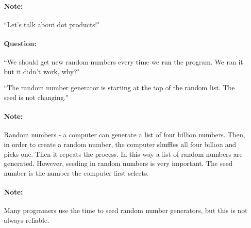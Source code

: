\documentclass[11pt]{article}
\begin{document}
\paragraph{Note:}``Let's talk about dot products!"

\paragraph{Question:}``We should get new random numbers every time we run the program. We ran it but it didn't work, why?"\\

\par ``The random number generator is starting at the top of the random list. The seed is not changing."

\paragraph{Note:}Random numbers - a computer can generate a list of four billion numbers. Then, in order to create a random number, the computer shuffles all four billion and picks one. Then it repeats the process. In this way a list of random numbers are generated. However, seeding in random numbers is very important. The seed number is the number the computer first selects.

\paragraph{Note:}Many programers use the time to seed random number generators, but this is not always reliable.
\vfill
\end{document}
